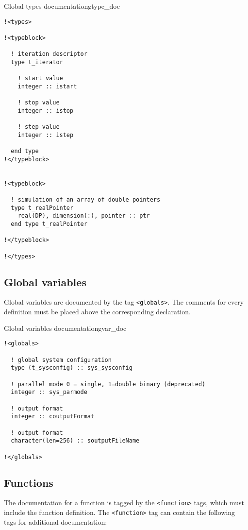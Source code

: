 \begin{code}{Global types documentation}{gtype_doc}
\begin{verbatim}
!<types>

!<typeblock>

  ! iteration descriptor
  type t_iterator

    ! start value
    integer :: istart

    ! stop value
    integer :: istop

    ! step value
    integer :: istep

  end type
!</typeblock>


!<typeblock>

  ! simulation of an array of double pointers
  type t_realPointer
    real(DP), dimension(:), pointer :: ptr
  end type t_realPointer

!</typeblock>

!</types>
\end{verbatim}
\end{code}

\subsection{Global variables}

Global variables are documented by the tag \verb+<globals>+.
The comments for every definition must
be placed above the corresponding declaration.

\begin{code}{Global variables documentation}{gvar_doc}
\begin{verbatim}
!<globals>

  ! global system configuration
  type (t_sysconfig) :: sys_sysconfig

  ! parallel mode 0 = single, 1=double binary (deprecated)
  integer :: sys_parmode

  ! output format
  integer :: coutputFormat

  ! output format
  character(len=256) :: soutputFileName

!</globals>

\end{verbatim}
\end{code}

\subsection{Functions}

The documentation for a function is tagged by the \verb+<function>+ tags, which
must include the function definition. The \verb+<function>+ tag can contain the following
tags for additional documentation:

